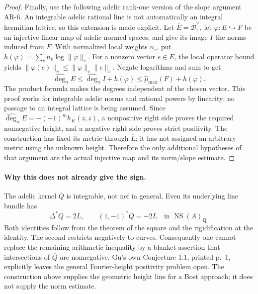 \begin{proof}
Finally, use the following adelic rank-one version of the slope
argument AR-6. An integrable adelic rational line is not automatically
an integral hermitian lattice, so this extension is made explicit.
Let $\overline E=\overline{\mathcal B}_z^{\vee}$, let
$\varphi:E\hookrightarrow F$ be an injective linear map of adelic
normed spaces, and give its image $I$ the norms induced from $F$.
With normalized local weights $n_v$, put
$h(\varphi)=\sum_v n_v\log\|\varphi\|_v$.
For a nonzero vector $e\in E$, the local operator bound yields
$\|\varphi(e)\|_v\le\|\varphi\|_v\|e\|_v$.
Negate logarithms and sum to get
\[
 \widehat{\deg}_n E\le
 \widehat{\deg}_n I+h(\varphi)
 \le\widehat\mu_{\max}(F)+h(\varphi).
\]
The product formula makes the degrees independent of the chosen vector.
This proof works for integrable adelic norms and rational powers by
linearity; no passage to an integral lattice is being assumed.
Since $\widehat{\deg}_n E=-(-1)^m h_K(z,z)$, a nonpositive
right side proves the required nonnegative height, and a negative
right side proves strict positivity. The construction has fixed its metric through
$\overline L$; it has not assigned an arbitrary metric using the
unknown height. Therefore the only additional hypotheses of that
argument are the actual injective map and its norm/slope estimate.
\end{proof}

\paragraph{Why this does not already give the sign.}
The adelic kernel $\overline Q$ is integrable, not nef in general.
Even its underlying line bundle has
\[
 \Delta^*Q=2L,\qquad (1,-1)^*Q=-2L
 \quad\text{in }\operatorname{NS}(A)_{\mathbf Q}.
\]
Both identities follow from the theorem of the square and the
rigidification at the identity. The second restricts negatively to
curves. Consequently one cannot replace the remaining arithmetic
inequality by a blanket assertion that intersections of $\overline Q$
are nonnegative. Gu's own Conjecture 1.1, printed p.~1, explicitly leaves
the general Fourier-height positivity problem open. The construction
above supplies the geometric height line for a Bost approach; it does
not supply the norm estimate.
